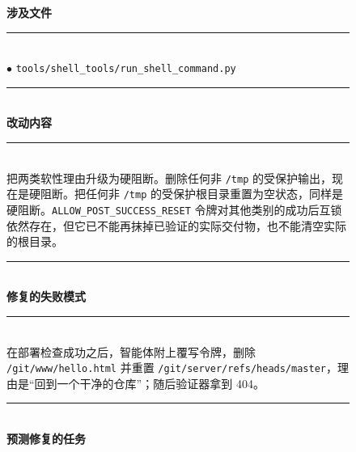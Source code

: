 \begin{figure}[t]
    \centering
    \scriptsize
    \begin{tcbraster}[raster columns=2,
                      raster equal height,
                      raster column skip=4pt,
                      raster row skip=0pt,
                      raster left skip=0pt,
                      raster right skip=0pt,
                      boxrule=0.6pt,
                      left=4pt,right=4pt,top=3pt,bottom=3pt,
                      coltitle=white]
        \begin{tcolorbox}[colback=aheSky!18,colframe=aheNavy,colbacktitle=aheNavy,
                          title={\scriptsize\textbf{chg-1，迭代 8，commit \texttt{ca35f53}，层级：工具实现}}]
            \textbf{\textcolor{aheNavy}{涉及文件}} \\
            \rule{\linewidth}{0.3pt}\\[1pt]
            $\bullet$ \texttt{tools/shell\_tools/run\_shell\_command.py} \\[3pt]
            \rule{\linewidth}{0.3pt}\\
            \textbf{\textcolor{aheNavy}{改动内容}} \\
            \rule{\linewidth}{0.3pt}\\[1pt]
            把两类软性理由升级为硬阻断。删除任何非 \texttt{/tmp} 的受保护输出，现在是硬阻断。把任何非 \texttt{/tmp} 的受保护根目录重置为空状态，同样是硬阻断。\texttt{ALLOW\_POST\_SUCCESS\_RESET} 令牌对其他类别的成功后互锁依然存在，但它已不能再抹掉已验证的实际交付物，也不能清空实际的根目录。 \\[3pt]
            \rule{\linewidth}{0.3pt}\\
            \textbf{\textcolor{aheNavy}{修复的失败模式}} \\
            \rule{\linewidth}{0.3pt}\\[1pt]
            在部署检查成功之后，智能体附上覆写令牌，删除 \texttt{/git/www/hello.html} 并重置 \texttt{/git/server/refs/heads/master}，理由是``回到一个干净的仓库''；随后验证器拿到 404。 \\[3pt]
            \rule{\linewidth}{0.3pt}\\
            \textbf{\textcolor{aheNavy}{预测修复的任务}} \\

\end{tcolorbox}
\end{tcbraster}
\end{figure}
